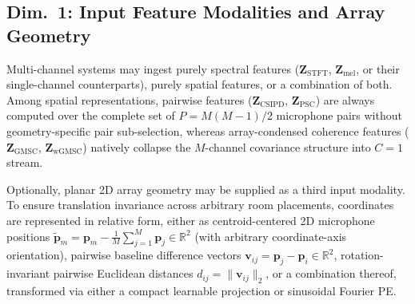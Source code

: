 \documentclass[lettersize,journal]{IEEEtran}
\begin{document}
\subsection{Dim.~1: Input Feature Modalities and Array Geometry}
\label{sec:dim_features}
Multi-channel systems may ingest purely spectral features ($\mathbf{Z}_{\mathrm{STFT}}$, $\mathbf{Z}_{\mathrm{mel}}$, or their single-channel counterparts), purely spatial features, or a combination of both. Among spatial representations, pairwise features ($\mathbf{Z}_{\mathrm{CSIPD}}$, $\mathbf{Z}_{\mathrm{PSC}}$) are always computed over the complete set of $P = M(M-1)/2$ microphone pairs without geometry-specific pair sub-selection, whereas array-condensed coherence features ($\mathbf{Z}_{\mathrm{GMSC}}$, $\mathbf{Z}_{\mathrm{wGMSC}}$) natively collapse the $M$-channel covariance structure into $C = 1$ stream.

Optionally, planar 2D array geometry may be supplied as a third input modality. To ensure translation invariance across arbitrary room placements, coordinates are represented in relative form, either as centroid-centered 2D microphone positions $\tilde{\mathbf{p}}_m = \mathbf{p}_m - \frac{1}{M}\sum_{j=1}^{M}\mathbf{p}_j \in \mathbb{R}^2$ (with arbitrary coordinate-axis orientation), pairwise baseline difference vectors $\mathbf{v}_{ij} = \mathbf{p}_j - \mathbf{p}_i \in \mathbb{R}^2$, rotation-invariant pairwise Euclidean distances $d_{ij} = \|\mathbf{v}_{ij}\|_2$, or a combination thereof, transformed via either a compact learnable projection or sinusoidal Fourier \gls{PE}.
\end{document}
